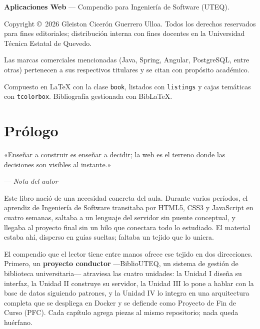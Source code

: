 \documentclass[11pt,a4paper,twoside,openright]{book}
\newcommand{\termino}[1]{\textbf{\textcolor{uteqverdeo}{#1}}}
\begin{document}
\thispagestyle{empty}
\vspace*{\fill}
\begin{flushleft}\small\color{textogris}
    \textbf{Aplicaciones Web} --- Compendio para Ingenier\'ia de Software (UTEQ).\par
    Copyright \copyright~2026 Gleiston Cicer\'on Guerrero Ulloa. Todos los derechos reservados para fines editoriales; distribuci\'on interna con fines docentes en la Universidad T\'ecnica Estatal de Quevedo.\par
    Las marcas comerciales mencionadas (Java, Spring, Angular, PostgreSQL, entre otras) pertenecen a sus respectivos titulares y se citan con prop\'osito acad\'emico.\par
    \vspace{4pt}
    Compuesto en \LaTeX{} con la clase \texttt{book}, listados con \texttt{listings} y cajas tem\'aticas con \texttt{tcolorbox}. Bibliograf\'ia gestionada con Bib\LaTeX{}.\par
\end{flushleft}
\vspace*{\fill}
\cleardoublepage

\pagestyle{plain}
\chapter*{Pr\'ologo}

\epigraph{«Ense\~nar a construir es ense\~nar a decidir; la web es el terreno donde las decisiones son visibles al instante.»}{--- \textit{Nota del autor}}

Este libro naci\'o de una necesidad concreta del aula. Durante varios per\'iodos, el aprendiz de Ingenier\'ia de Software transitaba por HTML5, CSS3 y JavaScript en cuatro semanas, saltaba a un lenguaje del servidor sin puente conceptual, y llegaba al proyecto final sin un hilo que conectara todo lo estudiado. El material estaba ah\'i, disperso en gu\'ias sueltas; faltaba un tejido que lo uniera.

El compendio que el lector tiene entre manos ofrece ese tejido en dos direcciones. Primero, un \termino{proyecto conductor} ---BiblioUTEQ, un sistema de gesti\'on de biblioteca universitaria--- atraviesa las cuatro unidades: la Unidad I dise\~na su interfaz, la Unidad II construye su servidor, la Unidad III lo pone a hablar con la base de datos siguiendo patrones, y la Unidad IV lo integra en una arquitectura completa que se despliega en Docker y se defiende como Proyecto de Fin de Curso (PFC). Cada cap\'itulo agrega piezas al mismo repositorio; nada queda hu\'erfano.
\end{document}
